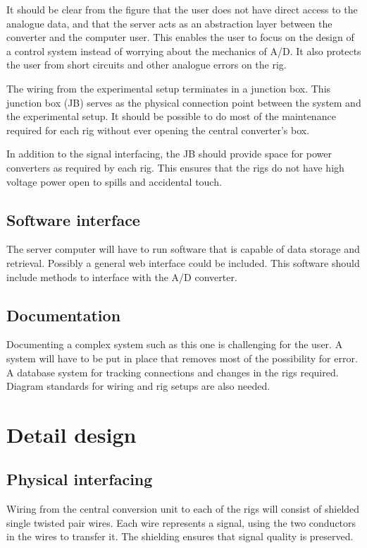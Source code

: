 It should be clear from the figure that the user does not have direct access to the analogue data, and that the server acts as an abstraction layer between the converter and the computer user.  This enables the user to focus on the design of a control system instead of worrying about the mechanics of A/D. It also protects the user from short circuits and other analogue errors on the rig.

The wiring from the experimental setup terminates in a junction box.  This junction box (JB) serves as the physical connection point between the system and the experimental setup.  It should be possible to do most of the maintenance required for each rig without ever opening the central converter's box. 

In addition to the signal interfacing, the JB should provide space for power converters as required by each rig.  This ensures that the rigs do not have high voltage power open to spills and accidental touch.

\subsection{Software interface}
The server computer will have to run software that is capable of data storage and retrieval.  Possibly a general web interface could be included.  This software should include methods to interface with the A/D converter.

\subsection{Documentation}
Documenting a complex system such as this one is challenging for the user.  A system will have to be put in place that removes most of the possibility for error.  A database system for tracking connections and changes in the rigs required.  Diagram standards for wiring and rig setups are also needed.

\section{Detail design}
\subsection{Physical interfacing}
Wiring from the central conversion unit to each of the rigs will consist of shielded single twisted pair wires.  Each wire represents a signal, using the two conductors in the wires to transfer it.  The shielding ensures that signal quality is preserved. 

